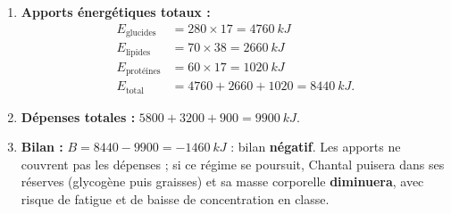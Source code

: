 \documentclass[11pt]{article}
\begin{document}
\begin{corrige}
\tcblower
\begin{enumerate}
\item \textbf{Apports énergétiques totaux :}
\begin{align*}
E_{\text{glucides}} &= 280 \times 17 = \SI{4760}{kJ}\\
E_{\text{lipides}} &= 70 \times 38 = \SI{2660}{kJ}\\
E_{\text{protéines}} &= 60 \times 17 = \SI{1020}{kJ}\\
E_{\text{total}} &= 4760 + 2660 + 1020 = \SI{8440}{kJ}.
\end{align*}
\item \textbf{Dépenses totales :} $5800 + 3200 + 900 = \SI{9900}{kJ}$.
\item \textbf{Bilan :} $B = 8440 - 9900 = -\SI{1460}{kJ}$ : bilan \textbf{négatif}. Les apports ne couvrent pas les dépenses ; si ce régime se poursuit, Chantal puisera dans ses réserves (glycogène puis graisses) et sa masse corporelle \textbf{diminuera}, avec risque de fatigue et de baisse de concentration en classe.
\end{enumerate}
\end{corrige}
\end{document}
